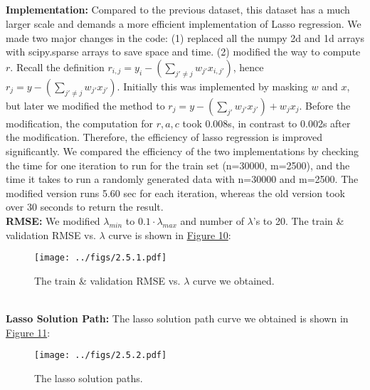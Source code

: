 \documentclass{article}
\begin{document}
        
        \subsection{}
        \textbf{Implementation: }Compared to the previous dataset, 
        this dataset has a much larger scale and demands a more efficient implementation of Lasso regression.
        We made two major changes in the code: (1) replaced all the numpy 2d and 1d arrays with scipy.sparse arrays to save space and time.
        (2) modified the way to compute $r$. Recall the definition $r_{i,j}=y_i-(\sum_{j'\neq j}w_{j'}x_{i,j'})$, 
        hence $r_{j}=y-(\sum_{j'\neq j}w_{j'}x_{j'})$. 
        Initially this was implemented by masking $w$ and $x$, but later we modified the method to $r_{j}=y-(\sum_{j'}w_{j'}x_{j'})+w_{j}x_{j}$.
        Before the modification, the computation for $r,a,c$ took 0.008s, in contrast to 0.002s after the modification.
        Therefore, the efficiency of lasso regression is improved significantly.
        We compared the efficiency of the two implementations by checking the time for one iteration to run for the train set (n=30000, m=2500),
        and the time it takes to run a randomly generated data with n=30000 and m=2500.
        The modified version runs 5.60 sec for each iteration, whereas the old version took over 30 seconds to return the result.
        \vspace{5pt}\\
        \textbf{RMSE: }We modified $\lambda_{min}$ to $0.1\cdot\lambda_{max}$ and number of $\lambda$'s to 20.
        The train \& validation RMSE vs. $\lambda$ curve is shown in \hyperref[fig:2.5.1]{Figure 10}:
        \begin{figure}[hbt!]
            \centering
            \texttt{[image: ../figs/2.5.1.pdf]}
            \caption{The train \& validation RMSE vs. $\lambda$ curve we obtained.}
            \label{fig:2.5.1}
        \end{figure}\\
        \textbf{Lasso Solution Path: }The lasso solution path curve we obtained is shown in \hyperref[fig:2.5.2]{Figure 11}:
        \begin{figure}[hbt!]
            \centering
            \texttt{[image: ../figs/2.5.2.pdf]}
            \caption{The lasso solution paths.}
            \label{fig:2.5.2}
        \end{figure}
        \vspace{5pt}\\
\end{document}
